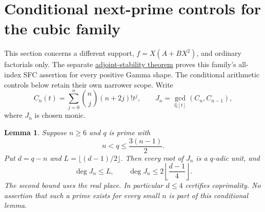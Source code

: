 \documentclass[11pt]{article}
\newtheorem{lemma}[theorem]{Lemma}
\begin{document}
\section{Conditional next-prime controls for the cubic family}
This section concerns a different support, $f=X(A+BX^2)$, and ordinary
factorials only. The separate
\href{CUBIC_ADJOINT_STABILITY_SFC.tex}{adjoint-stability theorem} proves
this family's all-index SFC assertion for every positive Gamma shape.
The conditional arithmetic controls below retain their own narrower scope.
Write
\[
 C_n(t)=\sum_{j=0}^n\binom nj(n+2j)!t^j,
 \qquad J_n=\gcd_{\mathbb Q[t]}(C_n,C_{n-1}),
\]
where $J_n$ is chosen monic.
\begin{lemma}\label{lem:gap}
Suppose $n\ge6$ and $q$ is prime with
\[
                     n<q\le\frac{3(n-1)}2.                \tag{14}
\]
Put $d=q-n$ and $L=\lfloor(d-1)/2\rfloor$. Then every root of $J_n$
is a $q$-adic unit, and
\[
             \deg J_n\le L,\qquad
             \deg J_n\le2\left\lfloor\frac{d-1}{4}\right\rfloor. \tag{15}
\]
The second bound uses the real place. In particular $d\le4$ certifies
coprimality. No assertion that such a prime exists for every small $n$
is part of this conditional lemma.
\end{lemma}
\end{document}
